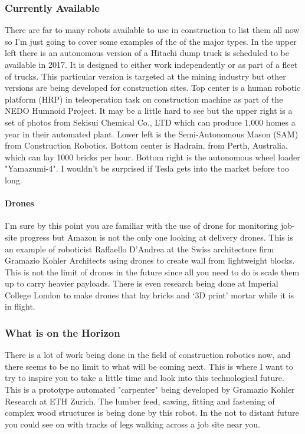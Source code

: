 \documentclass[11pt]{article}
\begin{document}
\subsubsection{Currently Available}
There are far to many robots available to use in construction to list them all now so I'm just going to cover some examples of the of the major types.  In the upper left there is an autonomous version of a Hitachi dump truck is scheduled to be available in 2017. It is designed to either work independently or as part of a fleet of trucks. This particular version is targeted at the mining industry but other versions are being developed for construction sites.  Top center is a human robotic platform (HRP) in teleoperation task on construction machine as part of the NEDO Humnoid Project.  It may be a little hard to see but the upper right is a set of photos from Sekisui Chemical Co., LTD which can produce 1,000 homes a year in their automated plant.  Lower left is the Semi-Autonomous Mason (SAM) from Construction Robotics.  Bottom center is Hadrain, from Perth, Australia, which can lay 1000 bricks per hour.  Bottom right is the autonomous wheel loader "Yamazumi-4".  I wouldn't be surprised if Tesla gets into the market before too long.
\paragraph{Drones}
I'm sure by this point you are familiar with the use of drone for monitoring job-site progress but Amazon is not the only one looking at delivery drones.  This is an example of roboticist Raffaello D’Andrea at the Swiss architecture firm Gramazio Kohler Architects using drones to create wall from lightweight blocks.  This is not the limit of drones in the future since all you need to do is scale them up to carry heavier payloads. There is even research being done at Imperial College London to make drones that lay bricks and ‘3D print’ mortar while it is in flight.
\subsubsection{What is on the Horizon}
There is a lot of work being done in the field of construction robotics now, and there seems to be no limit to what will be coming next.  This is where I want to try to inspire you to take a little time and look into this technological future.  This is a prototype automated "carpenter" being developed by Gramazio Kohler Research at ETH Zurich.  The lumber feed, sawing, fitting and fastening of complex wood structures is being done by this robot.  In the not to distant future you could see on with tracks of legs walking across a job site near you.
\end{document}
